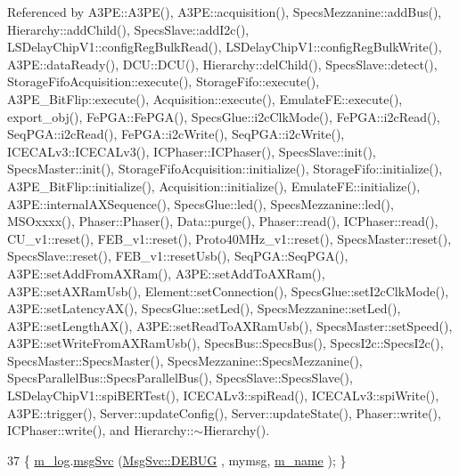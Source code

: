 Referenced by A3\+P\+E\+::\+A3\+P\+E(), A3\+P\+E\+::acquisition(), Specs\+Mezzanine\+::add\+Bus(), Hierarchy\+::add\+Child(), Specs\+Slave\+::add\+I2c(), L\+S\+Delay\+Chip\+V1\+::config\+Reg\+Bulk\+Read(), L\+S\+Delay\+Chip\+V1\+::config\+Reg\+Bulk\+Write(), A3\+P\+E\+::data\+Ready(), D\+C\+U\+::\+D\+C\+U(), Hierarchy\+::del\+Child(), Specs\+Slave\+::detect(), Storage\+Fifo\+Acquisition\+::execute(), Storage\+Fifo\+::execute(), A3\+P\+E\+\_\+\+Bit\+Flip\+::execute(), Acquisition\+::execute(), Emulate\+F\+E\+::execute(), export\+\_\+obj(), Fe\+P\+G\+A\+::\+Fe\+P\+G\+A(), Specs\+Glue\+::i2c\+Clk\+Mode(), Fe\+P\+G\+A\+::i2c\+Read(), Seq\+P\+G\+A\+::i2c\+Read(), Fe\+P\+G\+A\+::i2c\+Write(), Seq\+P\+G\+A\+::i2c\+Write(), I\+C\+E\+C\+A\+Lv3\+::\+I\+C\+E\+C\+A\+Lv3(), I\+C\+Phaser\+::\+I\+C\+Phaser(), Specs\+Slave\+::init(), Specs\+Master\+::init(), Storage\+Fifo\+Acquisition\+::initialize(), Storage\+Fifo\+::initialize(), A3\+P\+E\+\_\+\+Bit\+Flip\+::initialize(), Acquisition\+::initialize(), Emulate\+F\+E\+::initialize(), A3\+P\+E\+::internal\+A\+X\+Sequence(), Specs\+Glue\+::led(), Specs\+Mezzanine\+::led(), M\+S\+Oxxxx(), Phaser\+::\+Phaser(), Data\+::purge(), Phaser\+::read(), I\+C\+Phaser\+::read(), C\+U\+\_\+v1\+::reset(), F\+E\+B\+\_\+v1\+::reset(), Proto40\+M\+Hz\+\_\+v1\+::reset(), Specs\+Master\+::reset(), Specs\+Slave\+::reset(), F\+E\+B\+\_\+v1\+::reset\+Usb(), Seq\+P\+G\+A\+::\+Seq\+P\+G\+A(), A3\+P\+E\+::set\+Add\+From\+A\+X\+Ram(), A3\+P\+E\+::set\+Add\+To\+A\+X\+Ram(), A3\+P\+E\+::set\+A\+X\+Ram\+Usb(), Element\+::set\+Connection(), Specs\+Glue\+::set\+I2c\+Clk\+Mode(), A3\+P\+E\+::set\+Latency\+A\+X(), Specs\+Glue\+::set\+Led(), Specs\+Mezzanine\+::set\+Led(), A3\+P\+E\+::set\+Length\+A\+X(), A3\+P\+E\+::set\+Read\+To\+A\+X\+Ram\+Usb(), Specs\+Master\+::set\+Speed(), A3\+P\+E\+::set\+Write\+From\+A\+X\+Ram\+Usb(), Specs\+Bus\+::\+Specs\+Bus(), Specs\+I2c\+::\+Specs\+I2c(), Specs\+Master\+::\+Specs\+Master(), Specs\+Mezzanine\+::\+Specs\+Mezzanine(), Specs\+Parallel\+Bus\+::\+Specs\+Parallel\+Bus(), Specs\+Slave\+::\+Specs\+Slave(), L\+S\+Delay\+Chip\+V1\+::spi\+B\+E\+R\+Test(), I\+C\+E\+C\+A\+Lv3\+::spi\+Read(), I\+C\+E\+C\+A\+Lv3\+::spi\+Write(), A3\+P\+E\+::trigger(), Server\+::update\+Config(), Server\+::update\+State(), Phaser\+::write(), I\+C\+Phaser\+::write(), and Hierarchy\+::$\sim$\+Hierarchy().


\begin{DoxyCode}
37 \{ \hyperlink{classObject_a0d269813dd7ac1f24bc143031e2963f2}{m\_log}.\hyperlink{classMsgSvc_ad25f18047920cc59a314e5098259711c}{msgSvc} (\hyperlink{classMsgSvc_ae671eb7301996cd049d2da8a65925926a1dbdcc82dce88370ec335883c83b38b0}{MsgSvc::DEBUG}   , mymsg, \hyperlink{classObject_a8b83c95c705d2c3ba0d081fe1710f48d}{m\_name} ); \}
\end{DoxyCode}
\mbox{\label{classObject_a6c9a0397ca804e04d675ed05683f5420}} 
